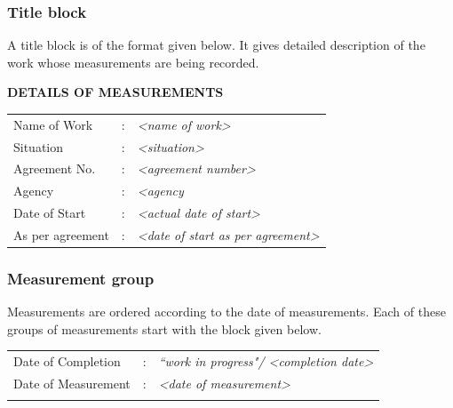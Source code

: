 \documentclass[twoside,a4paper]{refart}
\newenvironment{fminipage}[1]%
{\begin{Sbox}\begin{minipage}{#1}\begin{center}}%
		{\end{center}\end{minipage}\end{Sbox}\shadowbox{\TheSbox}}
\begin{document}
	 \subsubsection{Title block}
	 
	 A title block is of the format given below. It gives detailed description of the work whose measurements are being recorded.
	 
	 \begin{fminipage}{\textwidth}
	 	\begin{center}
	 		\textbf{DETAILS OF MEASUREMENTS} \\
	 	\end{center}
	 	
	 	\begin{longtabu}{p{.3\textwidth} c p{.5\textwidth}}
	 		Name of Work & : & \emph{\textless name of work\textgreater} \\
	 		Situation & : & \emph{\textless situation\textgreater}\\
	 		Agreement No. & : & \emph{\textless agreement number\textgreater}\\
	 		Agency & : & \emph{\textless agency}\\
	 		Date of Start & : & \emph{\textless actual date of start\textgreater}\\
	 		As per agreement & : & \emph{\textless date of start as per agreement\textgreater}\\
	 	\end{longtabu}
	 \end{fminipage}
	 
	 \subsubsection{Measurement group}
	 
	 Measurements are ordered according to the date of measurements. Each of these groups of measurements start with the block given below.
	 
	 \begin{fminipage}{\textwidth}
	 	\begin{longtabu}{p{.3\textwidth} c p{.5\textwidth}}
	 		Date of Completion & : & \emph{``work in progress"/ \textless completion date\textgreater} \\
	 		Date of Measurement & : & \emph{\textless date of measurement\textgreater} \\
	 		& & \\
	 	\end{longtabu}
	 \end{fminipage}
	 
\end{document}
